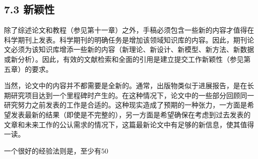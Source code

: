 \subsection*{7.3 新颖性}
除了综述论文和教程（参见第十一章）之外，手稿必须包含一些新的内容才值得在科学期刊上发表。科学期刊的明确任务是增加该领域知识库的内容。因此，期刊论文必须为该知识库增添一些新的内容（新理论、新设计、新模型、新方法、新数据或新分析）。因此，有效的文献检索和全面的引用是建立提交工作新颖性（参见第五章）的要求。

当然，论文中的内容并不都需要是全新的。通常，出版物类似于进展报告，是在长期研究项目达到一个里程碑时产生的。在这种情况下，论文中的一些部分回顾同一研究努力之前发表的工作是合适的。这种现实造成了预期的一种张力，一方面是希望发表最新的结果（即使是不完整的），另一方面是希望确保在考虑到过去发表的文章和未来工作的公认需求的情况下，这篇最新论文中有足够的新信息，使其值得一读。

一个很好的经验法则是，至少有50%

